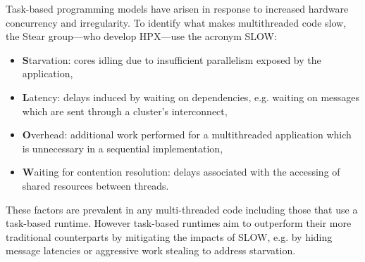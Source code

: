 


Task-based programming models have arisen in response to increased hardware concurrency and irregularity. To identify what makes multithreaded code slow, the Ste{\textbar}{\textbar}ar group---who develop HPX---use the acronym SLOW:
\begin{itemize}
\item {\bf S}tarvation: cores idling due to insufficient parallelism exposed by the application,
\item {\bf L}atency: delays induced by waiting on dependencies, e.g. waiting on messages which are sent through a cluster's interconnect,
\item {\bf O}verhead: additional work performed for a multithreaded application which is unnecessary in a sequential implementation,
\item {\bf W}aiting for contention resolution: delays associated with the accessing of shared resources between threads.
\end{itemize}
These factors are prevalent in any multi-threaded code including those that use a task-based runtime. However task-based runtimes aim to outperform their more traditional counterparts by mitigating the impacts of SLOW, e.g. by hiding message latencies or aggressive work stealing to address starvation.

